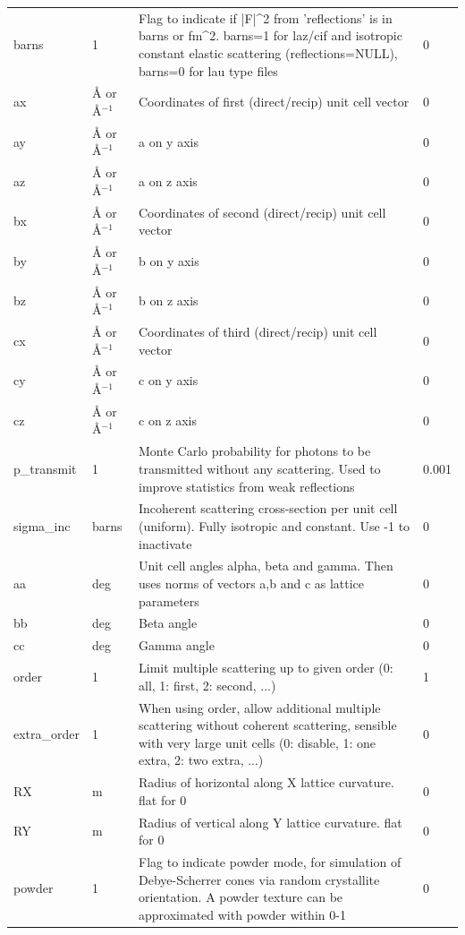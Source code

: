 \begin{longtable}{p{}p{}p{}p{}}
barns & 1 & Flag to indicate if |F|\textasciicircum{}2 from 'reflections' is in barns or fm\textasciicircum{}2. barns=1 for laz/cif and isotropic constant elastic scattering (reflections=NULL), barns=0 for lau type files & 0 \\
ax & \AA{} or \AA{}$^{-1}$ & Coordinates of first (direct/recip) unit cell vector & 0 \\
ay & \AA{} or \AA{}$^{-1}$ & a on y axis & 0 \\
az & \AA{} or \AA{}$^{-1}$ & a on z axis & 0 \\
bx & \AA{} or \AA{}$^{-1}$ & Coordinates of second (direct/recip) unit cell vector & 0 \\
by & \AA{} or \AA{}$^{-1}$ & b on y axis & 0 \\
bz & \AA{} or \AA{}$^{-1}$ & b on z axis & 0 \\
cx & \AA{} or \AA{}$^{-1}$ & Coordinates of third (direct/recip) unit cell vector & 0 \\
cy & \AA{} or \AA{}$^{-1}$ & c on y axis & 0 \\
cz & \AA{} or \AA{}$^{-1}$ & c on z axis & 0 \\
p\_transmit & 1 & Monte Carlo probability for photons to be transmitted without any scattering. Used to improve statistics from weak reflections & 0.001 \\
sigma\_inc & barns & Incoherent scattering cross-section per unit cell (uniform). Fully isotropic and constant. Use -1 to inactivate & 0 \\
aa & deg & Unit cell angles alpha, beta and gamma. Then uses norms of vectors a,b and c as lattice parameters & 0 \\
bb & deg & Beta angle & 0 \\
cc & deg & Gamma angle & 0 \\
order & 1 & Limit multiple scattering up to given order (0: all, 1: first, 2: second, ...) & 1 \\
extra\_order & 1 & When using order, allow additional multiple scattering without coherent scattering, sensible with very large unit cells (0: disable, 1: one extra, 2: two extra, ...) & 0 \\
RX & m & Radius of horizontal along X lattice curvature. flat for 0 & 0 \\
RY & m & Radius of vertical   along Y lattice curvature. flat for 0 & 0 \\
powder & 1 & Flag to indicate powder mode, for simulation of Debye-Scherrer cones via random crystallite orientation. A powder texture can be approximated with powder within 0-1 & 0 \\

\end{longtable}
